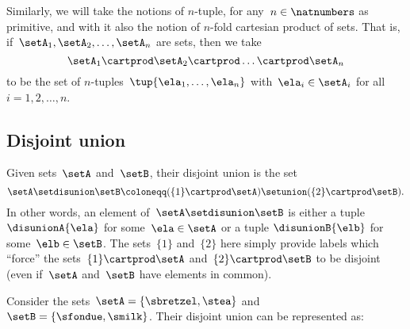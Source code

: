 Similarly, we will take the notions of $n$-tuple, for any~$n \in \natnumbers$ as primitive, and with it also the notion of $n$-fold cartesian product of sets.
That is, if~$\setA_1, \setA_2, \ldots, \setA_n$ are sets, then we take
\begin{equation*}
    \setA_1 \cartprod \setA_2 \cartprod \dots \cartprod \setA_n
\end{equation*}
to be the set of $n$-tuples~$\tup{\ela_1, \ldots, \ela_n}$ with~$\ela_i \in \setA_i$ for all~$i = 1,2,\ldots,n$.

\subsection{Disjoint union}
\label{sec:disjoint-union}

Given sets~$\setA$ and~$\setB$, their disjoint union is the set
\begin{equation*}
    \setA \setdisunion \setB \coloneqq (  \{ 1 \} \cartprod \setA) \setunion ( \{2\}  \cartprod \setB).
\end{equation*}
In other words, an element of~$\setA \setdisunion \setB$ is either a tuple~$\disunionA{\ela}$ for some~$\ela \in \setA$ or a tuple $\disunionB{\elb}$ for some~$\elb \in \setB$.
The sets~$\{ 1 \}$ and~$\{2\}$ here simply provide labels which ``force'' the sets~$\{ 1 \}  \cartprod \setA$ and~$ \{2\}  \cartprod \setB$ to be disjoint (even if~$\setA$ and~$\setB$ have elements in common).



Consider the sets~$\setA=\{\sbretzel, \stea\}$ and~$\setB=\{\sfondue, \smilk\}$.
Their disjoint union can be represented as:

